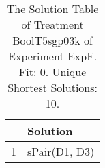 \begin{table}[ht]
\centering
\begin{tabular}{rp{9cm}}
  \hline
 & Solution \\ 
  \hline
1 & sPair(D1, D3) \\ 
   \hline
\end{tabular}
\caption{The Solution Table of Treatment BoolT5sgp03k of Experiment ExpF. Fit: 0. Unique Shortest Solutions: 10.} 
\end{table}
